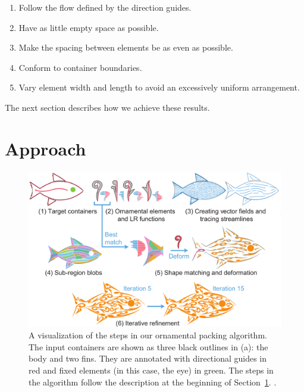 \begin{enumerate}
	\item Follow the flow defined by the direction guides.
	\item Have as little empty space as possible.
	\item Make the spacing between elements be as even as possible.
	\item Conform to container boundaries.
	\item Vary element width and length to avoid an excessively uniform arrangement.
\end{enumerate}
The next section describes how we achieve these results.

\section{Approach}
\label{flowpak_approach}

\begin{figure}[h!]
\centering
\includegraphics[width=1.0\textwidth]{figures/flowpak/pipeline.pdf} 
\caption[FLOWPAK pipeline]
{\label{fig_flowpak_pipeline} 
A visualization of the steps in our ornamental packing algorithm.
The input containers are shown as three black outlines in (a): the body
and two fins.  They are annotated with directional guides in red and fixed elements (in this 
case, the eye) in green.  The steps in the algorithm follow the
description at the beginning of Section~\ref{flowpak_approach}.
 .}
\end{figure}

